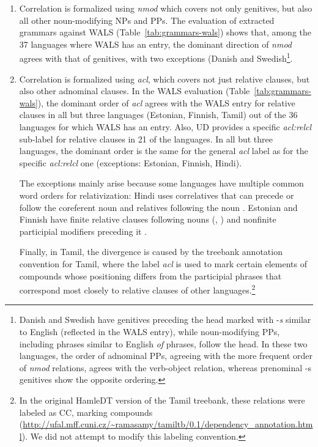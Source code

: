 \documentclass[10pt,twoside,lineno]{article}
\begin{document}
\begin{enumerate}
\item Correlation  is formalized using \emph{nmod} which covers not only genitives, but also all other noun-modifying NPs and PPs.
The evaluation of extracted grammars against WALS (Table~\ref{tab:grammars-wals}) shows that, among the 37 languages where WALS has an entry, the dominant direction of \emph{nmod} agrees with that of genitives, with two exceptions (Danish and Swedish\footnote{Danish and Swedish have genitives preceding the head marked with -\emph{s} similar to English (reflected in the WALS entry), while noun-modifying PPs, including phrases similar to English \emph{of} phrases, follow the head. In these two languages, the order of adnominal PPs, agreeing with the more frequent order of \emph{nmod} relations, agrees with the verb-object relation, whereas prenominal -s genitives show the opposite ordering.}.

\item Correlation  is formalized using \emph{acl}, which covers not just relative clauses, but also other adnominal clauses.
In the WALS evaluation (Table~\ref{tab:grammars-wals}), the dominant order of \emph{acl} agrees with the WALS entry for relative clauses in all but three languages (Estonian, Finnish, Tamil) out of the 36 languages for which WALS has an entry.
Also, UD provides a specific \emph{acl:relcl} sub-label for relative clauses in 21 of the languages.
In all but three languages, the dominant order is the same for the general \emph{acl} label as for the specific \emph{acl:relcl} one (exceptions: Estonian, Finnish, Hindi).

The exceptions mainly arise because some languages have multiple common word orders for relativization:
Hindi uses correlatives that can precede or follow the coreferent noun \citep[3.1.3]{montaut2004grammar} and relatives following the noun \citep[4.3]{montaut2004grammar}.
Estonian and Finnish have finite relative clauses following nouns (\citep[p. 176]{karlsson2013finnish}, \citep[p. 256]{tauli1983standard}) and nonfinite participial modifiers preceding it \citep[Chapter 18]{karlsson2013finnish}.

		Finally, in Tamil, the divergence is caused by the treebank annotation convention for Tamil, where the label \emph{acl} is used to mark certain elements of compounds whose positioning differs from the participial phrases that correspond most closely to relative clauses of other languages.\footnote{In the original HamleDT \citep{zeman2012hamledt, Ramasamy:2011:TDP:1964799.1964808} version of the Tamil treebank, these relations were labeled as CC, marking compounds (\url{http://ufal.mff.cuni.cz/~ramasamy/tamiltb/0.1/dependency_annotation.html}). We did not attempt to modify this labeling convention.}
	


\end{enumerate}
\end{document}
